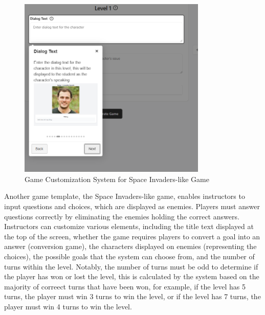 \begin{figure}
	\centering
	\includegraphics[width=0.8\textwidth]{figures/Diagnose_Game/Instructor_Portal_Diagnose_Game_hint.png}
	\caption{Game Customization System for Space Invaders-like Game}
	\label{fig:customizationSpaceInvaders}
\end{figure}


Another game template, the Space Invaders-like game, enables instructors to input questions and choices, which are displayed as enemies. Players must answer questions correctly by eliminating the enemies holding the correct answers. Instructors can customize various elements, including the title text displayed at the top of the screen, whether the game requires players to convert a goal into an answer (conversion game), the characters displayed on enemies (representing the choices), the possible goals that the system can choose from, and the number of turns within the level. Notably, the number of turns must be odd to determine if the player has won or lost the level, this is calculated by the system based on the majority of correect turns that have been won, for example, if the level has 5 turns, the player must win 3 turns to win the level, or if the level has 7 turns, the player must win 4 turns to win the level.

